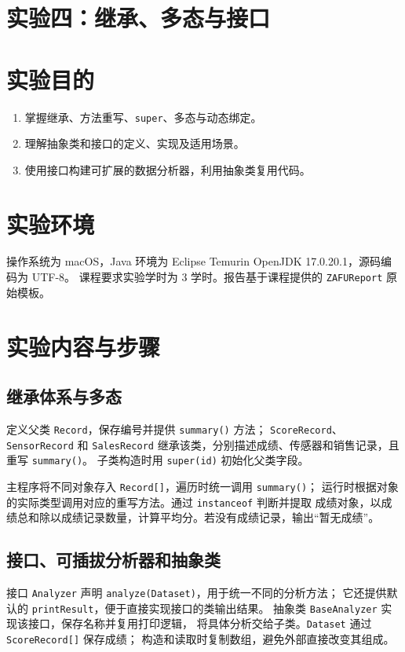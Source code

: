 \section*{实验四：继承、多态与接口}

\section{实验目的}
\begin{enumerate}
  \item 掌握继承、方法重写、\texttt{super}、多态与动态绑定。
  \item 理解抽象类和接口的定义、实现及适用场景。
  \item 使用接口构建可扩展的数据分析器，利用抽象类复用代码。
\end{enumerate}

\section{实验环境}
操作系统为 macOS，Java 环境为 Eclipse Temurin OpenJDK 17.0.20.1，源码编码为 UTF-8。
课程要求实验学时为 3 学时。报告基于课程提供的 \texttt{ZAFUReport} 原始模板。

\section{实验内容与步骤}
\subsection{继承体系与多态}
定义父类 \texttt{Record}，保存编号并提供 \texttt{summary()} 方法；
\texttt{ScoreRecord}、\texttt{SensorRecord} 和 \texttt{SalesRecord}
继承该类，分别描述成绩、传感器和销售记录，且重写 \texttt{summary()}。
子类构造时用 \texttt{super(id)} 初始化父类字段。

主程序将不同对象存入 \texttt{Record[]}，遍历时统一调用 \texttt{summary()}；
运行时根据对象的实际类型调用对应的重写方法。通过 \texttt{instanceof} 判断并提取
成绩对象，以成绩总和除以成绩记录数量，计算平均分。若没有成绩记录，输出“暂无成绩”。

\subsection{接口、可插拔分析器和抽象类}
接口 \texttt{Analyzer} 声明 \texttt{analyze(Dataset)}，用于统一不同的分析方法；
它还提供默认的 \texttt{printResult}，便于直接实现接口的类输出结果。
抽象类 \texttt{BaseAnalyzer} 实现该接口，保存名称并复用打印逻辑，
将具体分析交给子类。\texttt{Dataset} 通过 \texttt{ScoreRecord[]} 保存成绩；
构造和读取时复制数组，避免外部直接改变其组成。

